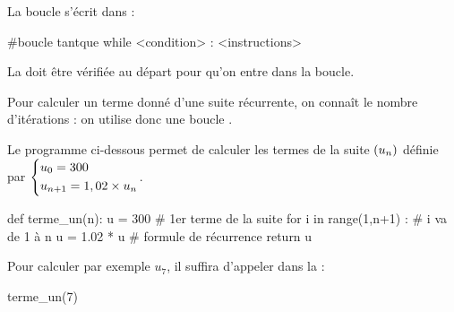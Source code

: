\documentclass[a4paper,11pt]{article}
\begin{document}
\begin{cpython}
La boucle  s'écrit dans \calgpython{} :
\vspace{-0.15cm}
\begin{envpython}[15cm]
	#boucle tantque
	while <condition> :
		<instructions>
\end{envpython}
 La  doit être vérifiée au départ pour qu'on entre dans la boucle.
\end{cpython}

\begin{calgo}
Pour calculer un terme donné d'une suite récurrente, on connaît le nombre d'itérations : on utilise donc une boucle .

Le programme \calgpython{} ci-dessous permet de calculer les termes de la suite $\left( u_n \right)$ définie par $\begin{dcases}u_0=300 \\ u_{n+1}= 1,02 \times u_n \end{dcases}$.

\begin{envpython}[15cm]
	def terme_un(n):
		u = 300                     # 1er terme de la suite
		for i in range(1,n+1) :     # i va de 1 à n
			u = 1.02 * u            # formule de récurrence
		return u
\end{envpython}

Pour calculer par exemple $u_7$, il suffira d'appeler dans la  :

\begin{consolepython}[15cm]
\begin{pyconsole}[][framesep=3mm,frame=single,label={[\scriptsize Début de la console \logopython]\scriptsize Fin de la console \logopython},fontsize=\footnotesize,framerule=1pt,rulecolor=\color{ForestGreen}]
terme_un(7)
\end{pyconsole}
\end{consolepython}
\end{calgo}
\end{document}
